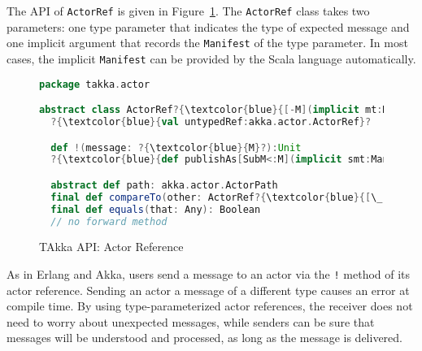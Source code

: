 The API of {\tt ActorRef} is given in Figure~\ref{takka_actor_reference_api}.  
The {\tt ActorRef} class takes two parameters: one type 
parameter that indicates the type of expected message and one implicit 
argument that records the {\tt Manifest} of the type parameter.  In most 
cases, the implicit {\tt Manifest} can be provided by the Scala language 
automatically.


\begin{figure}[h]
\begin{lstlisting}[language=scala,  escapechar=?]
package takka.actor 

abstract class ActorRef?{\textcolor{blue}{[-M](implicit mt:Manifest[M])}?
  ?{\textcolor{blue}{val untypedRef:akka.actor.ActorRef}? 

  def !(message: ?{\textcolor{blue}{M}?):Unit
  ?{\textcolor{blue}{def publishAs[SubM<:M](implicit smt:Manifest[SubM]):ActorRef[SubM]}?

  abstract def path: akka.actor.ActorPath
  final def compareTo(other: ActorRef?{\textcolor{blue}{[\_]}?): Int
  final def equals(that: Any): Boolean
  // no forward method

\end{lstlisting}
\caption{TAkka API: Actor Reference}
\label{takka_actor_reference_api}
\end{figure}

As in Erlang and Akka, users send a message to an actor via the {\tt !} 
method of its actor reference.   Sending an actor a message of a different type 
causes an error at compile time.  By using type-parameterized actor references, 
the receiver does not need to worry about unexpected messages, while senders 
can be sure that messages will be understood and processed, as long as the 
message is delivered.







